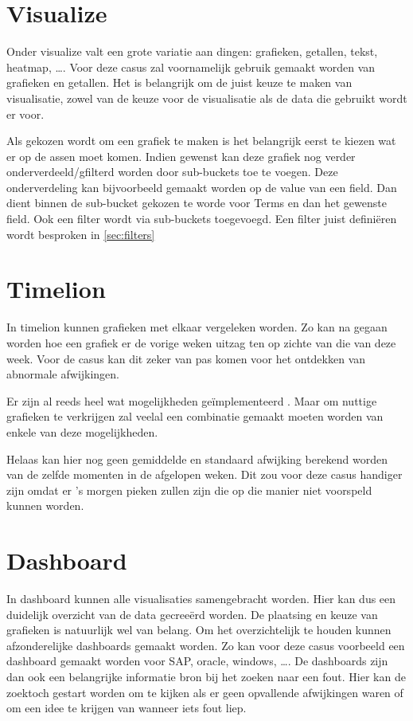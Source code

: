 \section{Visualize}
\label{sec:visualize}

Onder visualize valt een grote variatie aan dingen: grafieken, getallen, tekst, heatmap, \dots. Voor deze casus zal voornamelijk gebruik gemaakt worden van grafieken en getallen.
Het is belangrijk om de juist keuze te maken van visualisatie, zowel van de keuze voor de visualisatie als de data die gebruikt wordt er voor. 

Als gekozen wordt om een grafiek te maken is het belangrijk eerst te kiezen wat er op de assen moet komen. Indien gewenst kan deze grafiek nog verder onderverdeeld/gfilterd worden door sub-buckets toe te voegen.
Deze onderverdeling kan bijvoorbeeld gemaakt worden op de value van een field. Dan dient binnen de sub-bucket gekozen te worde voor Terms en dan het gewenste field.
Ook een filter wordt via sub-buckets toegevoegd. Een filter juist definiëren wordt besproken in \hyperref[sec:filters]{\ref{sec:filters}}



\section{Timelion}
\label{sec:timelion}

In timelion kunnen grafieken met elkaar vergeleken worden. Zo kan na gegaan worden hoe een grafiek er de vorige weken uitzag ten op zichte van die van deze week.
Voor de casus kan dit zeker van pas komen voor het ontdekken van abnormale afwijkingen. 

Er zijn al reeds heel wat mogelijkheden geïmplementeerd \autocite{timeliongithub}. 
Maar om nuttige grafieken te verkrijgen zal veelal een combinatie gemaakt moeten worden van enkele van deze mogelijkheden.

Helaas kan hier nog geen gemiddelde en standaard afwijking berekend worden van de zelfde momenten in de afgelopen weken.
Dit zou voor deze casus handiger zijn omdat er 's morgen pieken zullen zijn die op die manier niet voorspeld kunnen worden.

\section{Dashboard}
\label{sec:dashboard}

In dashboard kunnen alle visualisaties samengebracht worden. Hier kan dus een duidelijk overzicht van de data gecreeërd worden. De plaatsing en keuze van grafieken is natuurlijk wel van belang.
Om het overzichtelijk te houden kunnen afzonderelijke dashboards gemaakt worden. Zo kan voor deze casus voorbeeld een dashboard gemaakt worden voor SAP, oracle, windows, \dots.
De dashboards zijn dan ook een belangrijke informatie bron bij het zoeken naar een fout. Hier kan de zoektoch gestart worden om te kijken als er geen opvallende afwijkingen waren of om een idee te krijgen van wanneer iets fout liep.

